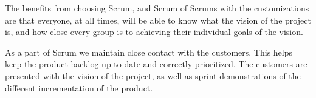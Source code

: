The benefits from choosing Scrum, and Scrum of Scrums with the customizations are that everyone, at all times, will be able to know what the vision of the project is, and how close every group is to achieving their individual goals of the vision.

As a part of Scrum we maintain close contact with the customers. This helps keep the product backlog up to date and correctly prioritized. The customers are presented with the vision of the project, as well as sprint demonstrations of the different incrementation of the product.